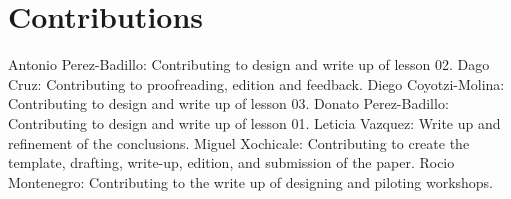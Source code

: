 \documentclass[conference]{IEEEtran}
\begin{document}
\section*{Contributions}
Antonio Perez-Badillo: Contributing to design and write up of lesson 02.
Dago Cruz: Contributing to proofreading, edition and feedback.
Diego Coyotzi-Molina: Contributing to design and write up of lesson 03.
Donato Perez-Badillo: Contributing to design and write up of lesson 01.
Leticia Vazquez: Write up and refinement of the conclusions.
Miguel Xochicale: Contributing to create the template, drafting, write-up, edition, and submission of the paper. 
Rocio Montenegro: Contributing to the write up of designing and piloting workshops. 


\end{document}
